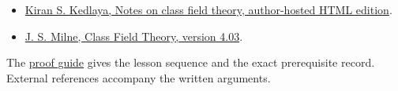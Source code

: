 \documentclass[11pt,a4paper]{article}
\newcommand{\tightlist}{\setlength{\itemsep}{0pt}\setlength{\parskip}{0pt}}
\begin{document}
\begin{itemize}
\tightlist
\item
  \href{https://kskedlaya.org/cft/sec_abstractcft1.html}{Kiran S.
  Kedlaya, Notes on class field theory, author-hosted HTML edition}.
\item
  \href{https://www.jmilne.org/math/CourseNotes/CFT.pdf}{J. S. Milne,
  Class Field Theory, version 4.03}.
\end{itemize}

The \href{../free-proofs.html}{proof guide} gives the lesson sequence
and the exact prerequisite record. External references accompany the
written arguments.
\end{document}
